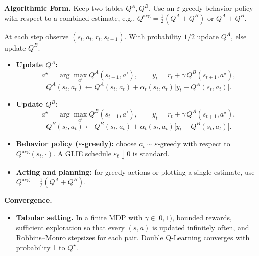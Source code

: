 \documentclass[
]{book}
\providecommand{\tightlist}{%
  \setlength{\itemsep}{0pt}\setlength{\parskip}{0pt}}
\theoremstyle{definition}
\theoremstyle{definition}
\theoremstyle{definition}
\theoremstyle{definition}
\theoremstyle{remark}
\begin{document}
\textbf{Algorithmic Form.} Keep two tables \(Q^A, Q^B\). Use an \(\varepsilon\)-greedy behavior policy with respect to a combined estimate, e.g., \(Q^{\text{avg}}= \tfrac12(Q^A+Q^B)\) or \(Q^A+Q^B\).

At each step observe \((s_t, a_t, r_{t}, s_{t+1})\). With probability \(1/2\) update \(Q^A\), else update \(Q^B\).

\begin{itemize}
\item
  \textbf{Update \(Q^A\):}
  \[
  a^\star = \arg\max_{a'} Q^A(s_{t+1}, a'),\qquad
  y_t = r_{t} + \gamma\, Q^B(s_{t+1}, a^\star),
  \]
  \[
  Q^A(s_t, a_t) \leftarrow Q^A(s_t, a_t) + \alpha_t(s_t,a_t)\big[y_t - Q^A(s_t, a_t)\big].
  \]
\item
  \textbf{Update \(Q^B\):}
  \[
  a^\star = \arg\max_{a'} Q^B(s_{t+1}, a'),\qquad
  y_t = r_{t} + \gamma\, Q^A(s_{t+1}, a^\star),
  \]
  \[
  Q^B(s_t, a_t) \leftarrow Q^B(s_t, a_t) + \alpha_t(s_t,a_t)\big[y_t - Q^B(s_t, a_t)\big].
  \]
\item
  \textbf{Behavior policy (\(\varepsilon\)-greedy):} choose \(a_t \sim \varepsilon\)-greedy with respect to \(Q^{\text{avg}}(s_t,\cdot)\).
  A GLIE schedule \(\varepsilon_t \downarrow 0\) is standard.
\item
  \textbf{Acting and planning:} for greedy actions or plotting a single estimate, use \(Q^{\text{avg}} = \tfrac12(Q^A+Q^B)\).
\end{itemize}

\textbf{Convergence.}

\begin{itemize}
\tightlist
\item
  \textbf{Tabular setting.} In a finite MDP with \(\gamma \in [0,1)\), bounded rewards, sufficient exploration so that every \((s,a)\) is updated infinitely often, and Robbins--Monro stepsizes for each pair. Double Q-Learning converges with probability 1 to \(Q^\star\).
\end{itemize}
\end{document}
